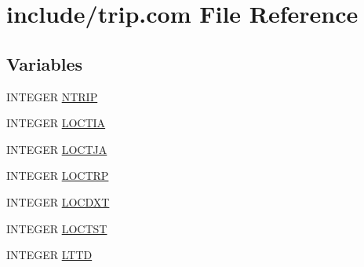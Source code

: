 \hypertarget{trip_8com}{\section{include/trip.com File Reference}
\label{trip_8com}
}
\subsection*{Variables}
\begin{DoxyCompactItemize}
\item 
I\-N\-T\-E\-G\-E\-R \hyperlink{trip_8com_a3d7b914361a6e11bdeb7e6b866517781}{N\-T\-R\-I\-P}
\item 
I\-N\-T\-E\-G\-E\-R \hyperlink{trip_8com_a9410695829be46f3379b92d229aab0aa}{L\-O\-C\-T\-I\-A}
\item 
I\-N\-T\-E\-G\-E\-R \hyperlink{trip_8com_a6b0b8b0dad59abf485e0f27ae437ea82}{L\-O\-C\-T\-J\-A}
\item 
I\-N\-T\-E\-G\-E\-R \hyperlink{trip_8com_a7338c756eee0f214801ca3c7c3b5f6ee}{L\-O\-C\-T\-R\-P}
\item 
I\-N\-T\-E\-G\-E\-R \hyperlink{trip_8com_a23376c308ff91ab97412c3efa31ea746}{L\-O\-C\-D\-X\-T}
\item 
I\-N\-T\-E\-G\-E\-R \hyperlink{trip_8com_a1da3a79d56d60efb2ec802079caef607}{L\-O\-C\-T\-S\-T}
\item 
I\-N\-T\-E\-G\-E\-R \hyperlink{trip_8com_a0d4fc998108c0f869ce087a3b54bdca6}{L\-T\-T\-D}
\end{DoxyCompactItemize}


